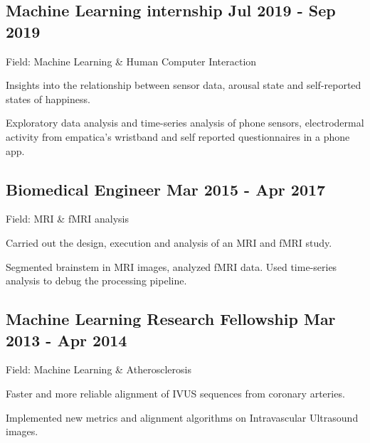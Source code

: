 \documentclass[a4paper,12pt]{article}
\begin{document}
\subsection{Machine Learning internship \hfill Jul 2019 - Sep 2019}
\vspace*{1pt}
Field: Machine Learning \& Human Computer Interaction \\
\vspace*{\spaceAfterField}
\begin{zitemize}
    \item Insights into the relationship between sensor data, arousal state and self-reported states of happiness.
    \item Exploratory data analysis and time-series analysis of phone sensors, electrodermal activity from empatica's wristband and self reported questionnaires in a phone app.

\end{zitemize}
\vspace*{5pt}



\vspace*{5pt}
\subsection{Biomedical Engineer \hfill Mar 2015 - Apr 2017}
\vspace*{1pt}
Field: MRI \& fMRI analysis
\vspace*{\spaceAfterField}
\begin{zitemize}
    \item Carried out the design, execution and analysis of an MRI and fMRI study.
    \item Segmented brainstem in MRI images, analyzed fMRI data. Used time-series analysis to debug the processing pipeline.

\end{zitemize}




\subsection{Machine Learning Research Fellowship \hfill Mar 2013 - Apr 2014}
\vspace*{1pt}
Field: Machine Learning \& Atherosclerosis
\vspace*{\spaceAfterField}
\begin{zitemize}
    \item Faster and more reliable alignment of IVUS sequences from coronary arteries.
    \item Implemented new metrics and alignment algorithms on Intravascular Ultrasound images.

\end{zitemize}
\end{document}
